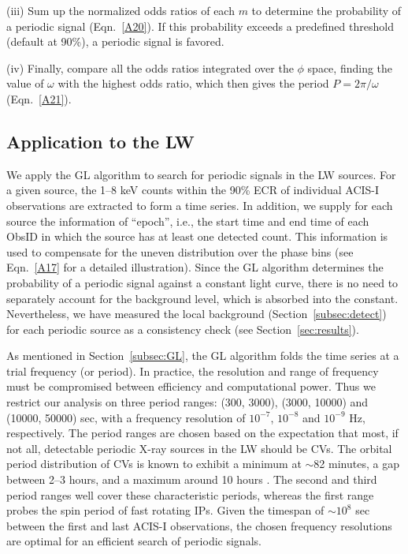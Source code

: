 \documentclass[fleqn,usenatbib]{mnras}
\begin{document}
(iii) Sum up the normalized odds ratios of each $m$ to determine the probability of a periodic signal (Eqn.~\ref{A20}).
If this probability exceeds a predefined threshold (default at 90\%), a periodic signal is favored. 

(iv) Finally, compare all the odds ratios integrated over the $\phi$ space, finding the value of $\omega$ with the highest odds ratio, which then gives the period $P=2{\pi}/\omega$ (Eqn.~\ref{A21}).

\subsection{Application to the LW}\label{subsec:appli}
We apply the GL algorithm to search for periodic signals in the LW sources. 
For a given source, the 1--8 keV counts within the 90\% ECR of individual ACIS-I observations are extracted to form a time series.  
In addition, we supply for each source the information of ``epoch'', i.e., the start time and end time of each ObsID in which the source has at least one detected count. This information is used to compensate for the uneven distribution over the phase bins (see Eqn.~\ref{A17} for a detailed illustration). 
Since the GL algorithm determines the probability of a periodic signal against a constant light curve, there is no need to separately account for the background level, which is absorbed into the constant. 
Nevertheless, we have measured the local background (Section~\ref{subsec:detect}) for each periodic source as a consistency check (see Section~\ref{sec:results}). 

As mentioned in Section~\ref{subsec:GL}, the GL algorithm folds the time series at a trial frequency (or period). 
In practice, the resolution and range of frequency must be compromised between efficiency and computational power. %
Thus we restrict our analysis on three period ranges: (300, 3000), (3000, 10000) and (10000, 50000) sec, with a frequency resolution of $10^{-7}$, $10^{-8}$ and $10^{-9}$ Hz, respectively. 
The period ranges are chosen based on the expectation that most, if not all, detectable periodic X-ray sources in the LW should be CVs. 
The orbital period distribution of CVs is known to exhibit a minimum at $\sim$82 minutes, a gap between 2--3 hours, and a maximum around 10 hours 
\citep{2011ApJS..194...28K}.
The second and third period ranges well cover these characteristic periods, whereas the first range probes the spin period of fast rotating IPs.
Given the timespan of $\sim10^8$ sec between the first and last ACIS-I observations, the chosen frequency resolutions are optimal for an efficient search of periodic signals.  
\end{document}
